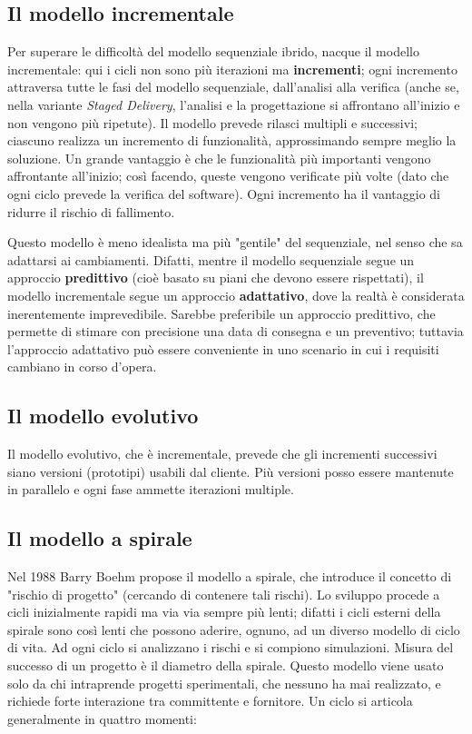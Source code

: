 \documentclass[a4paper]{article}
\begin{document}
		
	\subsection{Il modello incrementale}

		
Per superare le difficoltà del modello sequenziale ibrido, nacque il modello incrementale: qui i cicli non sono più iterazioni ma \textbf{incrementi}; ogni incremento attraversa tutte le fasi del modello sequenziale, dall'analisi alla verifica (anche se, nella variante \emph{Staged Delivery}, l'analisi e la progettazione si affrontano all'inizio e non vengono più ripetute). Il modello prevede rilasci multipli e successivi; ciascuno realizza un incremento di funzionalità, approssimando sempre meglio la soluzione. Un grande vantaggio è che le funzionalità più importanti vengono affrontante all'inizio; così facendo, queste vengono verificate più volte (dato che ogni ciclo prevede la verifica del software). Ogni incremento ha il vantaggio di ridurre il rischio di fallimento.
		
Questo modello è meno idealista ma più "gentile" del sequenziale, nel senso che sa adattarsi ai cambiamenti. Difatti, mentre il modello sequenziale segue un approccio \textbf{predittivo} (cioè basato su piani che devono essere rispettati), il modello incrementale segue un approccio \textbf{adattativo}, dove la realtà è considerata inerentemente imprevedibile. Sarebbe preferibile un approccio predittivo, che permette di stimare con precisione una data di consegna e un preventivo; tuttavia l'approccio adattativo può essere conveniente in uno scenario in cui i requisiti cambiano in corso d'opera.

		
	\subsection{Il modello evolutivo}

		
Il modello evolutivo, che è incrementale, prevede che gli incrementi successivi siano versioni (prototipi) usabili dal cliente. Più versioni posso essere mantenute in parallelo e ogni fase ammette iterazioni multiple.

		
	\subsection{Il modello a spirale}

		
Nel 1988 Barry Boehm propose il modello a spirale, che introduce il concetto di "rischio di progetto" (cercando di contenere tali rischi). Lo sviluppo procede a cicli inizialmente rapidi ma via via sempre più lenti; difatti i cicli esterni della spirale sono così lenti che possono aderire, ognuno, ad un diverso modello di ciclo di vita. Ad ogni ciclo si analizzano i rischi e si compiono simulazioni. Misura del successo di un progetto è il diametro della spirale. Questo modello viene usato solo da chi intraprende progetti sperimentali, che nessuno ha mai realizzato, e richiede forte interazione tra committente e fornitore. Un ciclo si articola generalmente in quattro momenti:
		
\end{document}
